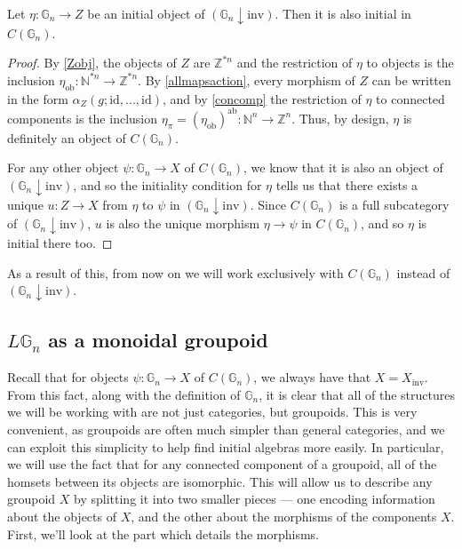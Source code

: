 \documentclass{amsart} %
\begin{document}
\begin{lem}\label{initialab} Let $\eta : \mathbb{G}_n \to Z$ be an initial object of $(\mathbb{G}_n \downarrow \mathrm{inv})$. Then it is also initial in $C(\mathbb{G}_n)$.
\end{lem}
\begin{proof}
By \cref{Zobj}, the objects of $Z$ are $\mathbb{Z}^{\ast n}$ and the restriction of $\eta$ to objects is the inclusion $\eta_{\mathrm{ob}} : \mathbb{N}^{\ast n} \to \mathbb{Z}^{\ast n}$. By \cref{allmapsaction}, every morphism of $Z$ can be written in the form $\alpha_Z(g; \mathrm{id}, ..., \mathrm{id})$, and by \ref{concomp} the restriction of $\eta$ to connected components is the inclusion $\eta_\pi = (\eta_{\mathrm{ob}})^{\mathrm{ab}} : \mathbb{N}^n \to \mathbb{Z}^n$. Thus, by design, $\eta$ is definitely an object of $C(\mathbb{G}_n)$. 

For any other object $\psi: \mathbb{G}_n \to X$ of $C(\mathbb{G}_n)$, we know that it is also an object of $(\mathbb{G}_n \downarrow \mathrm{inv})$, and so the initiality condition for $\eta$ tells us that there exists a unique $u : Z \to X$ from $\eta$ to $\psi$ in $(\mathbb{G}_n \downarrow \mathrm{inv})$. Since $C(\mathbb{G}_n)$ is a full subcategory of $(\mathbb{G}_n \downarrow \mathrm{inv})$, $u$ is also the unique morphism $\eta \to \psi$ in $C(\mathbb{G}_n)$, and so $\eta$ is initial there too.
\end{proof}

As a result of this, from now on we will work exclusively with $C(\mathbb{G}_n)$ instead of $(\mathbb{G}_n \downarrow \mathrm{inv})$.

\subsection{$L\mathbb{G}_n$ as a monoidal groupoid}

Recall that for objects $\psi: \mathbb{G}_n \to X$ of $C(\mathbb{G}_n)$, we always have that $X = X_{\mathrm{inv}}$. From this fact, along with the definition of $\mathbb{G}_n$, it is clear that all of the structures we will be working with are not just categories, but groupoids. This is very convenient, as groupoids are often much simpler than general categories, and we can exploit this simplicity to help find initial algebras more easily. In particular, we will use the fact that for any connected component of a groupoid, all of the homsets between its objects are isomorphic. This will allow us to describe any groupoid $X$ by splitting it into two smaller pieces --- one encoding information about the objects of $X$, and the other about the morphisms of the components $X$. First, we'll look at the part which details the morphisms.
\end{document}
